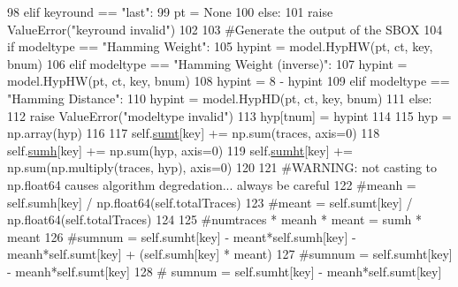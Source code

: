 \begin{DoxyCode}
{98                 \textcolor{keywordflow}{elif} keyround == \textcolor{stringliteral}{"last"}:
99                     pt = \textcolor{keywordtype}{None}
100                 \textcolor{keywordflow}{else}:
101                     \textcolor{keywordflow}{raise} ValueError(\textcolor{stringliteral}{"keyround invalid"})
102 
103                 \textcolor{comment}{#Generate the output of the SBOX}
104                 \textcolor{keywordflow}{if} modeltype == \textcolor{stringliteral}{"Hamming Weight"}:
105                     hypint = model.HypHW(pt, ct, key, bnum)
106                 \textcolor{keywordflow}{elif} modeltype == \textcolor{stringliteral}{"Hamming Weight (inverse)"}:
107                     hypint = model.HypHW(pt, ct, key, bnum)
108                     hypint = 8 - hypint
109                 \textcolor{keywordflow}{elif} modeltype == \textcolor{stringliteral}{"Hamming Distance"}:
110                     hypint = model.HypHD(pt, ct, key, bnum)
111                 \textcolor{keywordflow}{else}:
112                     \textcolor{keywordflow}{raise} ValueError(\textcolor{stringliteral}{"modeltype invalid"})
113                 hyp[tnum] = hypint
114 
115             hyp = np.array(hyp)
116 
117             self.\hyperlink{classsoftware_1_1chipwhisperer_1_1analyzer_1_1attacks_1_1cpa__algorithms_1_1experimentalchannelinfo_1_1CPAProgressiveOneSubkey_a4c14a5677ce305927aa6e9f4b45be9ea}{sumt}[key] += np.sum(traces, axis=0)
118             self.\hyperlink{classsoftware_1_1chipwhisperer_1_1analyzer_1_1attacks_1_1cpa__algorithms_1_1experimentalchannelinfo_1_1CPAProgressiveOneSubkey_a7b626cdb9f5cf746c43291b1d1f0aa4c}{sumh}[key] += np.sum(hyp, axis=0)
119             self.\hyperlink{classsoftware_1_1chipwhisperer_1_1analyzer_1_1attacks_1_1cpa__algorithms_1_1experimentalchannelinfo_1_1CPAProgressiveOneSubkey_a59f4415f854eac5b02940eb3eccc0d84}{sumht}[key] += np.sum(np.multiply(traces, hyp), axis=0)
120 
121             \textcolor{comment}{#WARNING: not casting to np.float64 causes algorithm degredation... always be careful}
122             \textcolor{comment}{#meanh = self.sumh[key] / np.float64(self.totalTraces)}
123             \textcolor{comment}{#meant = self.sumt[key] / np.float64(self.totalTraces)}
124 
125             \textcolor{comment}{#numtraces * meanh * meant = sumh * meant}
126             \textcolor{comment}{#sumnum =  self.sumht[key] - meant*self.sumh[key] - meanh*self.sumt[key] + (self.sumh[key] *
       meant)}
127             \textcolor{comment}{#sumnum =  self.sumht[key] - meanh*self.sumt[key]}
128 \textcolor{comment}{#            sumnum =  self.sumht[key] - meanh*self.sumt[key]}
}
\end{DoxyCode}
